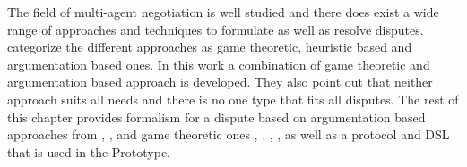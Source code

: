 \documentclass[12pt,msc,a4paper,oneside]{ucl_thesis}
\begin{document}
The field of multi-agent negotiation is well studied and there does exist a wide range of approaches and techniques to formulate as well as resolve disputes. \cite{Rahwan:2003:AN:1030328.1030332} categorize the different approaches as game theoretic, heuristic based and argumentation based ones. In this work a combination of game theoretic and argumentation based approach is developed. They also point out that neither approach suits all needs and there is no one type that fits all disputes. The rest of this chapter provides formalism for a dispute based on argumentation based approaches from \cite{Lodder:ORD_system_design}, \cite{Bellucci:2004:IAI:1032651.1033678}, \cite{Rahwan:2003:AN:1030328.1030332} and game theoretic ones \cite{Susskind:Logic_of_mediating_values}, \cite{Ragone:2006:PAO:1124566.1124569}, \cite{Ragone2008}, \cite{Wooldridge:2000:LN:3006433.3006516}, \cite{Chevaleyre:2005:NOS:1082473.1082518} as well as a protocol and DSL that is used in the Prototype.
\end{document}
